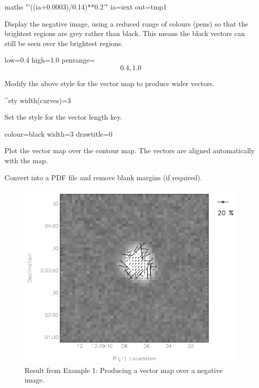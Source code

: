 \begin{terminalv}
maths "'((ia+0.0003)/0.14)**0.2'" ia=iext out=tmp1
\end{terminalv}


Display the negative image, using a reduced range of colours (pens) so
that the brightest regions are grey rather than black.  This means the
black vectors can still be seen over the brightest regions.

\begin{terminalv}
        low=0.4 high=1.0
        penrange=\[0.4,1.0\]
\end{terminalv}


Modify the above style for the vector map to produce wider vectors.

\begin{terminalv}
^sty
width(curves)=3
\end{terminalv}


Set the style for the vector length key.

\begin{terminalv}
colour=black
width=3
drawtitle=0
\end{terminalv}


Plot the vector map over the contour map. The vectors are aligned automatically with the map.

\begin{terminalv}
\end{terminalv}


Convert into a PDF file and remove blank margins (if required).

\begin{terminalv}
\end{terminalv}


\begin{figure}[t!]
\begin{center}
\includegraphics[width=0.75\linewidth]{sc22-kappa-plots-plot3.png}
\caption [Vector map with negative image in polplot]{Result from
  Example 1: Producing a vector map over a negative image.\label{fig:kappa-plot3}}
\end{center}
\end{figure}


